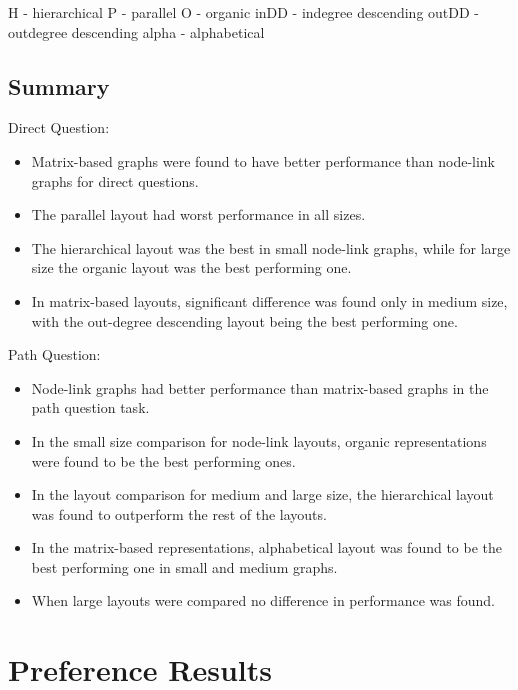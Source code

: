 \documentclass{l4proj}
\begin{document}
H - hierarchical P - parallel O - organic inDD - indegree descending outDD - outdegree descending alpha - alphabetical

\subsection{Summary}

Direct Question:
\begin{itemize}
 \itemsep0em
	\item Matrix-based graphs were found to have better performance than node-link graphs for direct questions.
	\item The parallel layout had worst performance in all sizes.
	\item The hierarchical layout was the best in small node-link graphs, while for large size the organic layout was the best performing one.
	\item In matrix-based layouts, significant difference was found only in medium size, with the out-degree descending layout being the best performing one.
\end{itemize}
Path Question:
\begin{itemize}
\itemsep0em
	\item Node-link graphs had better performance than matrix-based graphs in the path question task.
	\item In the small size comparison for node-link layouts, organic representations were found to be the best performing ones.
	\item In the layout comparison for medium and large size, the hierarchical layout was found to outperform the rest of the layouts.
	\item In the matrix-based representations, alphabetical layout was found to be the best performing one in small and medium graphs.
	\item When large layouts were compared no difference in performance was found.
\end{itemize}


\section{Preference Results} 
\end{document}
